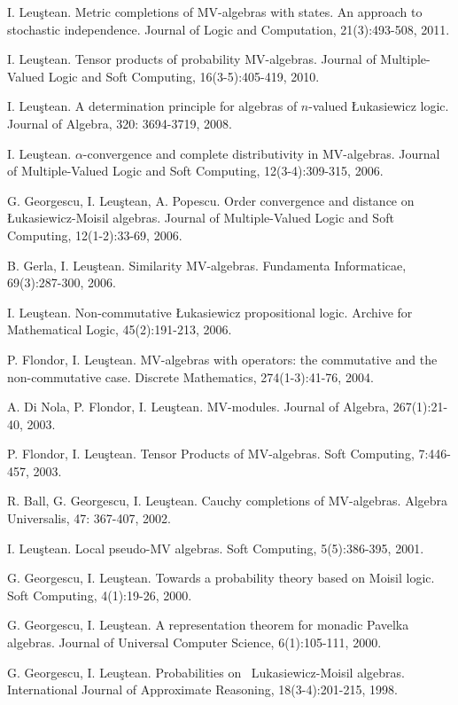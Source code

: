 \documentclass[11pt]{article}
\begin{document}
\noindent
[J17] I. Leu\c stean. Metric completions of MV-algebras with states. An approach to stochastic independence. Journal of Logic and Computation, 21(3):493-508, 2011.

\noindent
[J16] I. Leu\c stean. Tensor products of probability MV-algebras.
Journal of Multiple-Valued Logic and Soft Computing, 16(3-5):405-419, 2010.

\noindent
[J15] I. Leu\c stean. A determination principle for  algebras of $n$-valued \L ukasiewicz logic. Journal of Algebra, 320: 3694-3719, 2008.

\noindent
[J14] I. Leu\c stean. $\alpha$-convergence and complete distributivity in MV-algebras. Journal of Multiple-Valued Logic and Soft Computing, 12(3-4):309-315, 2006.

\noindent
[J13] G. Georgescu, I. Leu\c stean, A. Popescu. Order convergence and distance on \L ukasiewicz-Moisil algebras. Journal of Multiple-Valued Logic and Soft Computing, 12(1-2):33-69, 2006.

\noindent
[J12] B. Gerla, I. Leu\c stean. Similarity MV-algebras. Fundamenta Informaticae, 69(3):287-300, 2006.

\noindent
[J11] I. Leu\c stean. Non-commutative \L ukasiewicz propositional logic. Archive for Mathematical Logic, 45(2):191-213, 2006.

\noindent
[J10] P. Flondor, I. Leu\c{s}tean. MV-algebras with operators: the commutative and the non-commutative case. Discrete Mathematics, 274(1-3):41-76, 2004.

\noindent
[J9] A. Di Nola, P. Flondor, I. Leu\c{s}tean. MV-modules. Journal of Algebra, 267(1):21-40, 2003.

\noindent
[J8] P. Flondor, I. Leu\c{s}tean. Tensor Products of MV-algebras. Soft Computing, 7:446-457, 2003.

\noindent
[J7] R. Ball, G. Georgescu, I. Leu\c stean. Cauchy completions of MV-algebras. Algebra Universalis, 47: 367-407, 2002.

\noindent
[J6] I. Leu\c stean. Local pseudo-MV algebras. Soft Computing, 5(5):386-395, 2001.

\noindent
[J5] G. Georgescu, I. Leu\c stean. Towards a probability theory based on Moisil logic. Soft Computing, 4(1):19-26, 2000.

\noindent
[J4] G. Georgescu, I. Leu\c stean. A representation theorem for monadic Pavelka algebras. Journal of Universal Computer Science, 6(1):105-111, 2000.

\noindent
[J3] G. Georgescu, I. Leu\c stean. Probabilities on \ Lukasiewicz-Moisil algebras. International Journal of Approximate Reasoning, 18(3-4):201-215, 1998.
\end{document}
